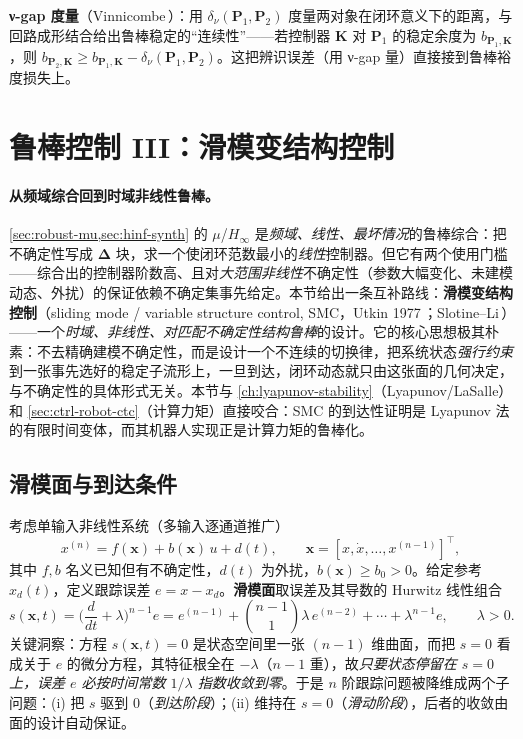 \textbf{ν-gap 度量}（Vinnicombe\,\cite{vinnicombe2001uncertainty}）：用 $\delta_\nu(\mathbf P_1,\mathbf P_2)$ 度量两对象在闭环意义下的距离，与回路成形结合给出鲁棒稳定的“连续性”——若控制器 $\mathbf K$ 对 $\mathbf P_1$ 的稳定余度为 $b_{\mathbf P_1,\mathbf K}$，则 $b_{\mathbf P_2,\mathbf K}\ge b_{\mathbf P_1,\mathbf K}-\delta_\nu(\mathbf P_1,\mathbf P_2)$。这把辨识误差（用 ν-gap 量）直接接到鲁棒裕度损失上。

\section{鲁棒控制 III：滑模变结构控制}
\label{sec:robust-smc}

\paragraph{从频域综合回到时域非线性鲁棒。}
\cref{sec:robust-mu,sec:hinf-synth} 的 $\mu$/$H_\infty$ 是\emph{频域、线性、最坏情况}的鲁棒综合：把不确定性写成 $\boldsymbol\Delta$ 块，求一个使闭环范数最小的\emph{线性}控制器。但它有两个使用门槛——综合出的控制器阶数高、且对\emph{大范围非线性}不确定性（参数大幅变化、未建模动态、外扰）的保证依赖不确定集事先给定。本节给出一条互补路线：\textbf{滑模变结构控制}（sliding mode / variable structure control, SMC，Utkin 1977\,\cite{utkin1977variable}；Slotine--Li\,\cite{slotine1991applied}）——一个\emph{时域、非线性、对匹配不确定性结构鲁棒}的设计。它的核心思想极其朴素：不去精确建模不确定性，而是设计一个不连续的切换律，把系统状态\emph{强行约束}到一张事先选好的稳定子流形上，一旦到达，闭环动态就只由这张面的几何决定，与不确定性的具体形式无关。本节与 \cref{ch:lyapunov-stability}（Lyapunov/LaSalle）和 \cref{sec:ctrl-robot-ctc}（计算力矩）直接咬合：SMC 的到达性证明是 Lyapunov 法的有限时间变体，而其机器人实现正是计算力矩的鲁棒化。

\subsection{滑模面与到达条件}
考虑单输入非线性系统（多输入逐通道推广）
\begin{equation}
  x^{(n)}=f(\mathbf x)+b(\mathbf x)\,u+d(t),\qquad \mathbf x=[x,\dot x,\dots,x^{(n-1)}]^\top,
  \label{eq:smc-plant}
\end{equation}
其中 $f,b$ 名义已知但有不确定性，$d(t)$ 为外扰，$b(\mathbf x)\ge b_0>0$。给定参考 $x_d(t)$，定义跟踪误差 $e=x-x_d$。\textbf{滑模面}取误差及其导数的 Hurwitz 线性组合
\begin{equation}
  s(\mathbf x,t)=\Big(\frac{d}{dt}+\lambda\Big)^{n-1}e
  =e^{(n-1)}+\binom{n-1}{1}\lambda\,e^{(n-2)}+\cdots+\lambda^{n-1}e,\qquad \lambda>0.
  \label{eq:smc-surface}
\end{equation}
关键洞察：方程 $s(\mathbf x,t)=0$ 是状态空间里一张 $(n-1)$ 维曲面，而把 $s=0$ 看成关于 $e$ 的微分方程，其特征根全在 $-\lambda$（$n-1$ 重），故\emph{只要状态停留在 $s=0$ 上，误差 $e$ 必按时间常数 $1/\lambda$ 指数收敛到零}。于是 $n$ 阶跟踪问题被降维成两个子问题：(i) 把 $s$ 驱到 $0$（\emph{到达阶段}）；(ii) 维持在 $s=0$（\emph{滑动阶段}），后者的收敛由面的设计自动保证。

